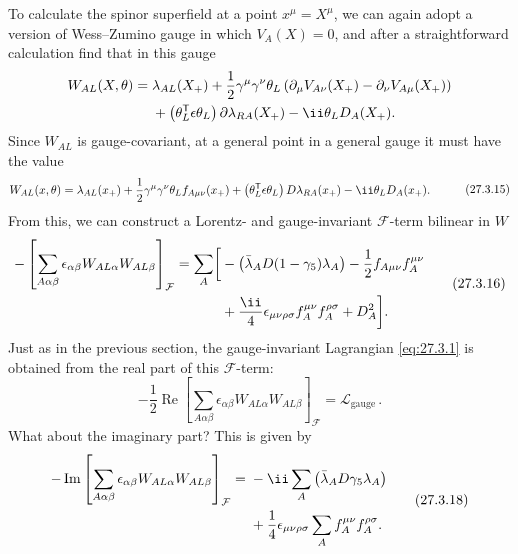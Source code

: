 To calculate the spinor superfield at a point \(x^\mu=X^\mu\), we can
again adopt a version of Wess--Zumino gauge in which \(V_A(X)=0\), and
after a straightforward calculation find that in this gauge
\[
  \begin{aligned}
  W_{AL}(X,\theta)={}&
  \lambda_{AL}(X_+)
  +\frac12\gamma^\mu\gamma^\nu\theta_L
    \left(
      \partial_\mu V_{A\nu}(X_+)-\partial_\nu V_{A\mu}(X_+)
    \right)
  \\
  &+\left(\theta_L^{\mathsf T}\epsilon\theta_L\right)
    \sl{\partial}\lambda_{RA}(X_+)
  -\ii\theta_LD_A(X_+).
  \end{aligned}
\]
Since \(W_{AL}\) is gauge-covariant, at a general point in a general gauge
it must have the value
\begin{equation}
  \begin{aligned}
  W_{AL}(x,\theta)={}&
  \lambda_{AL}(x_+)
  +\frac12\gamma^\mu\gamma^\nu\theta_L f_{A\mu\nu}(x_+)
  +\left(\theta_L^{\mathsf T}\epsilon\theta_L\right)
    \sl{D}\lambda_{RA}(x_+)
  -\ii\theta_LD_A(x_+).
  \end{aligned}
  \tag{27.3.15}\label{eq:27.3.15}
\end{equation}
From this, we can construct a Lorentz- and gauge-invariant
\(\mathcal{F}\)-term bilinear in \(W\)
\begin{equation}
  \begin{aligned}
  -\left[
    \sum_{A\alpha\beta}
    \epsilon_{\alpha\beta}W_{AL\alpha}W_{AL\beta}
  \right]_{\mathcal{F}}
  =\sum_A\biggl[
    &-\left(\bar\lambda_A\sl{D}(1-\gamma_5)\lambda_A\right)
    -\frac12 f_{A\mu\nu}f_A^{\mu\nu}
  \\
    &+\frac{\ii}{4}\epsilon_{\mu\nu\rho\sigma}
      f_A^{\mu\nu}f_A^{\rho\sigma}
    +D_A^2
  \biggr].
  \end{aligned}
  \tag{27.3.16}\label{eq:27.3.16}
\end{equation}
Just as in the previous section, the gauge-invariant Lagrangian
\eqref{eq:27.3.1} is obtained from the real part of this
\(\mathcal{F}\)-term:
\begin{equation}
  -\frac12\operatorname{Re}\left[
    \sum_{A\alpha\beta}
    \epsilon_{\alpha\beta}W_{AL\alpha}W_{AL\beta}
  \right]_{\mathcal{F}}
  =\mathcal{L}_{\mathrm{gauge}}\,.
  \tag{27.3.17}\label{eq:27.3.17}
\end{equation}
What about the imaginary part? This is given by
\begin{equation}
  \begin{aligned}
  -\operatorname{Im}\left[
    \sum_{A\alpha\beta}
    \epsilon_{\alpha\beta}W_{AL\alpha}W_{AL\beta}
  \right]_{\mathcal{F}}
  ={}&
  -\ii\sum_A\left(\bar\lambda_A\sl{D}\gamma_5\lambda_A\right)
  \\
  &+\frac14\epsilon_{\mu\nu\rho\sigma}
    \sum_A f_A^{\mu\nu}f_A^{\rho\sigma}.
  \end{aligned}
  \tag{27.3.18}\label{eq:27.3.18}
\end{equation}

